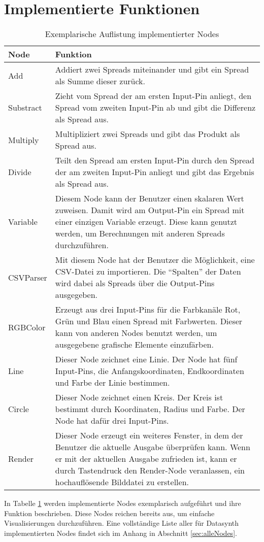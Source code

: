 \documentclass[a4paper, 
               12pt,
               DIV=calc,
               version=first,
               pdftex,
               headsepline,
               footsepline,
               bibtotocnumbered,
               liststotocnumbered]{scrreprt}
\begin{document}
\section{Implementierte Funktionen}
\label{sec:ImplementierteNodes}
\begin{table}
\centering
\begin{tabular}{|l|p{10cm}|}
\hline
\textbf{Node} & \textbf{Funktion}\\
\hline
Add & Addiert zwei Spreads miteinander und gibt ein Spread als Summe dieser zurück.\\
\hline
Substract & Zieht vom Spread der am ersten Input-Pin anliegt, den Spread vom zweiten Input-Pin ab und gibt die Differenz als Spread aus.\\
\hline
Multiply & Multipliziert zwei Spreads und gibt das Produkt als Spread aus.\\
\hline
Divide & Teilt den Spread am ersten Input-Pin durch den Spread der am zweiten Input-Pin anliegt und gibt das Ergebnis als Spread aus.\\
\hline
Variable & Diesem Node kann der Benutzer einen skalaren Wert zuweisen. Damit wird am Output-Pin ein Spread mit einer einzigen
Variable erzeugt. Diese kann genutzt werden, um Berechnungen mit anderen Spreads durchzuführen.\\
\hline
CSVParser & Mit diesem Node hat der Benutzer die Möglichkeit, eine CSV-Datei zu importieren.
Die "`Spalten"' der Daten wird dabei als Spreads über die Output-Pins ausgegeben.\\
\hline
RGBColor & Erzeugt aus drei Input-Pins für die Farbkanäle Rot, Grün und Blau einen Spread mit Farbwerten. Dieser
kann von anderen Nodes benutzt werden, um ausgegebene grafische Elemente einzufärben.\\
\hline
Line & Dieser Node zeichnet eine Linie. Der Node hat fünf Input-Pins, die Anfangskoordinaten, Endkoordinaten und Farbe
der Linie bestimmen.\\
\hline
Circle & Dieser Node zeichnet einen Kreis. Der Kreis ist bestimmt durch Koordinaten, Radius und Farbe. Der Node
hat dafür drei Input-Pins.\\
\hline
Render & Dieser Node erzeugt ein weiteres Fenster, in dem der Benutzer die aktuelle Ausgabe überprüfen kann.
Wenn er mit der aktuellen Ausgabe zufrieden ist, kann er durch Tastendruck den Render-Node veranlassen, ein
hochauflösende Bilddatei zu erstellen.\\
\hline
\end{tabular}
\caption{Exemplarische Auflistung implementierter Nodes}
\label{tab:nodes}
\end{table}
In Tabelle \ref{tab:nodes} werden implementierte Nodes exemplarisch aufgeführt und ihre Funktion beschrieben.
Diese Nodes reichen bereits aus, um einfache Visualisierungen durchzuführen. Eine vollständige Liste aller
für Datasynth implementierten Nodes findet sich im Anhang in Abschnitt \ref{sec:alleNodes}.
\end{document}
